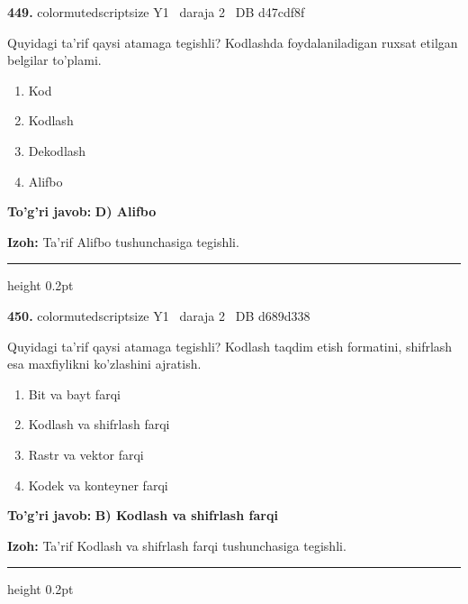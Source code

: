 \documentclass[10pt,a4paper,oneside]{article}
\begin{document}
\noindent\textbf{\color{ink}449.}  {color{muted}scriptsize Y1 \textbullet\ daraja 2 \textbullet\ DB d47cdf8f}
\par
Quyidagi ta'rif qaysi atamaga tegishli? Kodlashda foydalaniladigan ruxsat etilgan belgilar to'plami.
\begin{enumerate}[label=\Alph*),leftmargin=9mm]
\item Kod
\item Kodlash
\item Dekodlash
\item Alifbo
\end{enumerate}
\begin{tcolorbox}[enhanced,breakable,colback=teal!4,colframe=teal!50!black,boxrule=0.5pt,arc=1.1mm,left=3mm,right=3mm,top=1.7mm,bottom=1.7mm,before skip=2mm,after skip=2mm]
\textbf{\color{teal}To'g'ri javob:} \textbf{D) Alifbo}
\par\smallskip
\textbf{Izoh:} Ta'rif Alifbo tushunchasiga tegishli.
\end{tcolorbox}
\vspace{2mm}\hrule height 0.2pt \vspace{3mm}

\noindent\textbf{\color{ink}450.}  {color{muted}scriptsize Y1 \textbullet\ daraja 2 \textbullet\ DB d689d338}
\par
Quyidagi ta'rif qaysi atamaga tegishli? Kodlash taqdim etish formatini, shifrlash esa maxfiylikni ko'zlashini ajratish.
\begin{enumerate}[label=\Alph*),leftmargin=9mm]
\item Bit va bayt farqi
\item Kodlash va shifrlash farqi
\item Rastr va vektor farqi
\item Kodek va konteyner farqi
\end{enumerate}
\begin{tcolorbox}[enhanced,breakable,colback=teal!4,colframe=teal!50!black,boxrule=0.5pt,arc=1.1mm,left=3mm,right=3mm,top=1.7mm,bottom=1.7mm,before skip=2mm,after skip=2mm]
\textbf{\color{teal}To'g'ri javob:} \textbf{B) Kodlash va shifrlash farqi}
\par\smallskip
\textbf{Izoh:} Ta'rif Kodlash va shifrlash farqi tushunchasiga tegishli.
\end{tcolorbox}
\vspace{2mm}\hrule height 0.2pt \vspace{3mm}
\end{document}
